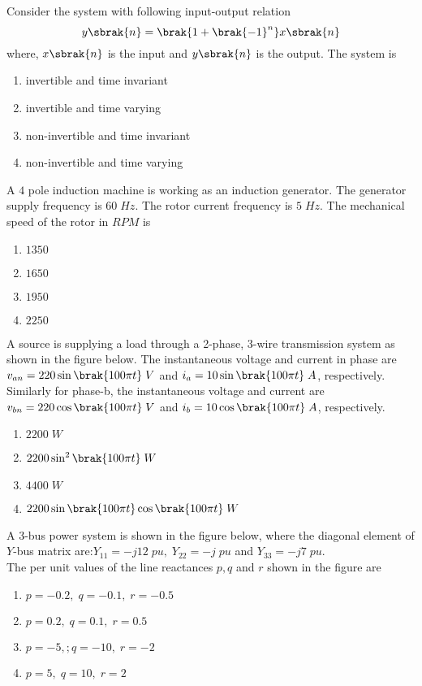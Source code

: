 \item Consider the system with following input-output relation $$y\sbrak{n}=\brak{1+\brak{-1}^n}x\sbrak{n}$$ where, $x\sbrak{n}$ is the input and $y\sbrak{n}$ is the output. The system is
\begin{enumerate}
    \item invertible and time invariant 
    \item invertible and time varying
    \item non-invertible and time invariant
    \item non-invertible and time varying
\end{enumerate}
\item A $4$ pole induction machine is working as an induction generator. The generator supply frequency is $60\;Hz$. The rotor current frequency is $5\;Hz$. The mechanical speed of the rotor in $RPM$ is
\begin{enumerate}
    \item $1350$
    \item $1650$
    \item $1950$
    \item $2250$
\end{enumerate}
\item A source is supplying a load through a 2-phase, 3-wire transmission system as shown in the figure below. The instantaneous voltage and current in phase are $v_{an}=220\sin{\brak{100\pi t}}\;V$ and $i_a=10\sin{\brak{100\pi t}}\;A$, respectively. Similarly for phase-b, the instantaneous voltage and current are $v_{bn}=220\cos{\brak{100\pi t}}\;V$ and $i_b=10\cos{\brak{100\pi t}}\;A$, respectively.

\begin{enumerate}
    \item $2200\;W$
    \item $2200\sin^2{\brak{100\pi t}}\;W$
    \item $4400\;W$
    \item $2200\sin{\brak{100\pi t}}\cos{\brak{100\pi t}}\;W$
\end{enumerate}
\item A 3-bus power system is shown in the figure below, where the diagonal element of $Y$-bus matrix are:$Y_{11}=-j12\;pu,\;Y_{22}=-j\;pu$ and $Y_{33}=-j7\;pu$.\\

The per unit values of the line reactances $p,q$ and $r$ shown in the figure are
\begin{enumerate}
    \item $p=-0.2,\;q=-0.1,\;r=-0.5$
    \item $p=0.2,\;q=0.1,\;r=0.5$
    \item $p=-5,;q=-10,\;r=-2$
    \item $p=5,\;q=10,\;r=2$
\end{enumerate}
